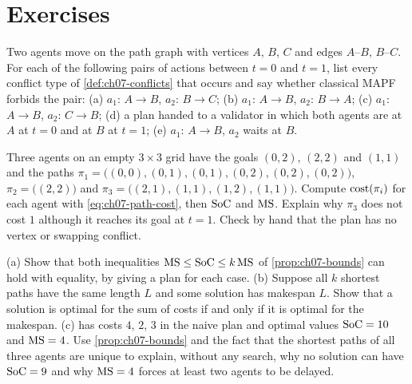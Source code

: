 \section{Exercises}
\label{sec:ch07-exercises}

\begin{exercise}[\difficulty{1}]
\label{exr:ch07-classify}
Two agents move on the path graph with vertices $A$, $B$, $C$ and edges
$A$--$B$, $B$--$C$. For each of the following pairs of actions between
$t = 0$ and $t = 1$, list every conflict type of \cref{def:ch07-conflicts}
that occurs and say whether classical MAPF forbids the pair:
(a) $a_1$: $A \to B$, $a_2$: $B \to C$;
(b) $a_1$: $A \to B$, $a_2$: $B \to A$;
(c) $a_1$: $A \to B$, $a_2$: $C \to B$;
(d) a plan handed to a validator in which both agents are at $A$ at $t = 0$
and at $B$ at $t = 1$;
(e) $a_1$: $A \to B$, $a_2$ waits at $B$.
\end{exercise}

\begin{exercise}[\difficulty{1}]
\label{exr:ch07-costs}
Three agents on an empty $3 \times 3$ grid have the goals $(0,2)$, $(2,2)$
and $(1,1)$ and the paths
$\pi_1 = \bigl((0,0), (0,1), (0,1), (0,2), (0,2), (0,2)\bigr)$,
$\pi_2 = \bigl((2,2)\bigr)$ and
$\pi_3 = \bigl((2,1), (1,1), (1,2), (1,1)\bigr)$.
Compute $\operatorname{cost}(\pi_i)$ for each agent with \cref{eq:ch07-path-cost}, then
$\mathrm{SoC}$ and $\mathrm{MS}$. Explain why $\pi_3$ does not cost $1$ although
it reaches its goal at $t = 1$. Check by hand that the plan has no vertex or
swapping conflict.
\end{exercise}

\begin{exercise}[\difficulty{2}]
\label{exr:ch07-objectives}
(a) Show that both inequalities $\mathrm{MS} \le \mathrm{SoC} \le k\,\mathrm{MS}$ of
\cref{prop:ch07-bounds} can hold with equality, by giving a plan for each
case. (b) Suppose all $k$ shortest paths have the same length $L$ and some
solution has makespan $L$. Show that a solution is optimal for the sum of
costs if and only if it is optimal for the makespan. (c) 
has costs $4$, $2$, $3$ in the naive plan and optimal values $\mathrm{SoC} = 10$
and $\mathrm{MS} = 4$. Use \cref{prop:ch07-bounds} and the fact that the shortest paths of all
three agents are unique to explain, without any search, why no solution can
have $\mathrm{SoC} = 9$ and why $\mathrm{MS} = 4$ forces at least two agents to
be delayed.
\end{exercise}


